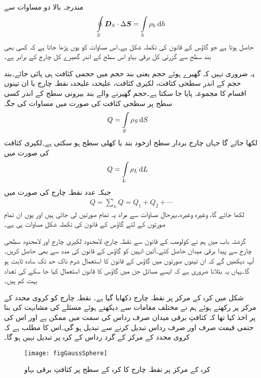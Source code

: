 مندرجہ بالا دو مساوات سے
\begin{align}\label{مساوات_گاؤس_کے_قانون_کی_تکملہ_شکل}
\oint\limits_{S} \kvec{D}_S \cdot \Delta \kvec{S}=\int\limits_{h} \rho_h \dif h
\end{align}
حاصل ہوتا ہے جو گاؤس کے قانون کی تکملہ شکل ہے۔اس مساوات کو یوں پڑھا جاتا ہے کہ کسی بھی بند سطح سے گزرتی کل برقی بہاو اس سطح کے اندر گھیرے کل چارج کے برابر  ہے۔

یہ ضروری نہیں کہ گھیرے ہوئے حجم یعنی بند حجم میں حجمی کثافت ہی پائی جائے۔بند حجم کے اندر  سطحی کثافت، لکیری کثافت، علیحدہ علیحدہ نقطہ چارج یا ان تینوں اقسام کا مجموعہ پایا جا سکتا ہے۔حجم گھیرنے والے بند بیرونی سطح کے اندر کسی سطح پر  سطحی کثافت کی صورت میں مساوات  کی جگہ
\begin{align}
Q&=\int\limits_{S} \rho_S \dif S
\end{align}
لکھا جائے گا جہاں چارج بردار سطح ازخود بند یا کھلی سطح ہو سکتی ہے۔لکیری کثافت کی صورت میں
\begin{align}
Q&=\int\limits_{L} \rho_L \dif L
\end{align}
جبکہ   عدد نقطہ چارج کی صورت میں
\begin{align}
Q=\sum_n Q= Q_1+Q_2+\cdots
\end{align}
لکھا جائے گا، وغیرہ وغیرہ۔بہرحال مساوات  سے مراد یہ تمام صورتیں لی جاتی ہیں اور یوں ان تمام صورتوں کے لئے گاؤس کے  قانون کی تکملہ شکل مساوات  ہی ہے۔


گزشتہ باب میں ہم نے کولومب کے قانون سے نقطہ چارج، لامحدود  لکیری چارج اور لامحدود سطحی چارج  سے پیدا برقی میدان حاصل کئے۔آئیں انہیں کو  گاؤس کے قانون کی مدد سے بھی حاصل کریں۔ آپ دیکھیں گے کہ ان تینوں صورتوں میں گاؤس کے قانون کا استعمال شرم ناک حد تک سادہ ثابت ہو گا۔یہاں یہ بتلانا ضروری ہے کہ ایسے  مسائل جن میں گاؤس کا قانون استعمال کیا جا سکے کی تعداد  بہت کم ہیں۔

شکل  میں کرہ کے مرکز پر نقطہ چارج دکھایا گیا ہے۔ نقطہ چارج کو کروی محدد کے مرکز پر رکھتے ہوئے ہم  نے مختلف مقامات سے دیکھتے ہوئے مسئلے کی مشابہت کی بنا پر اخذ کیا تھا کہ کثافتِ برقی میدان صرف رداس کی سمت میں ممکن ہے اور اس  کی حتمی قیمت صرف اور صرف رداس  تبدیل کرنے سے تبدیل ہو گی۔اس کا مطلب ہے کہ کروی محدد کے مرکز کے گرد رداس  کے کرہ  پر  تبدیل نہیں ہو گا۔
\begin{figure}
\centering
\texttt{[image: figGaussSphere]}
\caption{کرہ کے مرکز پر نقطہ چارج کا کرہ کے سطح پر کثافتِ برقی بہاو}
\label{شکل_گاؤس_کرہ_کی_سطح_پر_مرکز_کے_نقطہ_چرج_کا_میدان}
\end{figure}

